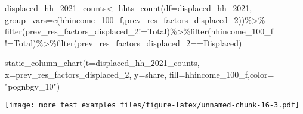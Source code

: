\documentclass[
]{article}
\newenvironment{Shaded}{\begin{snugshade}}{\end{snugshade}}
\newcommand{\AttributeTok}[1]{\textcolor[rgb]{0.77,0.63,0.00}{#1}}
\newcommand{\FunctionTok}[1]{\textcolor[rgb]{0.00,0.00,0.00}{#1}}
\newcommand{\NormalTok}[1]{#1}
\newcommand{\OtherTok}[1]{\textcolor[rgb]{0.56,0.35,0.01}{#1}}
\newcommand{\SpecialCharTok}[1]{\textcolor[rgb]{0.00,0.00,0.00}{#1}}
\newcommand{\StringTok}[1]{\textcolor[rgb]{0.31,0.60,0.02}{#1}}
\begin{document}
\begin{Shaded}
\begin{Highlighting}[]
\NormalTok{displaced\_hh\_2021\_counts}\OtherTok{\textless{}{-}} \FunctionTok{hhts\_count}\NormalTok{(}\AttributeTok{df=}\NormalTok{displaced\_hh\_2021, }\AttributeTok{group\_vars=}\FunctionTok{c}\NormalTok{(}\StringTok{\textquotesingle{}hhincome\_100\_f\textquotesingle{}}\NormalTok{,}\StringTok{\textquotesingle{}prev\_res\_factors\_displaced\_2\textquotesingle{}}\NormalTok{))}\SpecialCharTok{\%\textgreater{}\%}
\FunctionTok{filter}\NormalTok{(prev\_res\_factors\_displaced\_2}\SpecialCharTok{!=}\StringTok{\textquotesingle{}Total\textquotesingle{}}\NormalTok{)}\SpecialCharTok{\%\textgreater{}\%}\FunctionTok{filter}\NormalTok{(hhincome\_100\_f }\SpecialCharTok{!=}\StringTok{\textquotesingle{}Total\textquotesingle{}}\NormalTok{)}\SpecialCharTok{\%\textgreater{}\%}\FunctionTok{filter}\NormalTok{(prev\_res\_factors\_displaced\_2}\SpecialCharTok{==}\StringTok{\textquotesingle{}Displaced\textquotesingle{}}\NormalTok{)}

\FunctionTok{static\_column\_chart}\NormalTok{(}\AttributeTok{t=}\NormalTok{displaced\_hh\_2021\_counts, }\AttributeTok{x=}\StringTok{\textquotesingle{}prev\_res\_factors\_displaced\_2\textquotesingle{}}\NormalTok{, }\AttributeTok{y=}\StringTok{\textquotesingle{}share\textquotesingle{}}\NormalTok{, }\AttributeTok{fill=}\StringTok{\textquotesingle{}hhincome\_100\_f\textquotesingle{}}\NormalTok{,}\AttributeTok{color=}  \StringTok{"pognbgy\_10"}\NormalTok{)}
\end{Highlighting}
\end{Shaded}

\texttt{[image: more\_test\_examples\_files/figure-latex/unnamed-chunk-16-3.pdf]}
\end{document}
